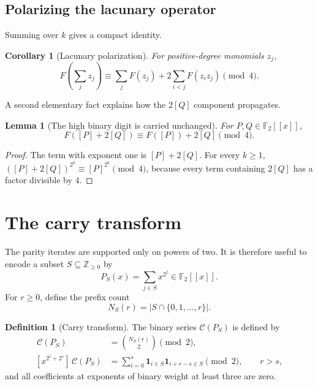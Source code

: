 \documentclass[11pt]{article}
\newtheorem{lemma}[theorem]{Lemma}
\newtheorem{corollary}[theorem]{Corollary}
\theoremstyle{definition}
\newtheorem{definition}[theorem]{Definition}
\theoremstyle{remark}
\newcommand{\Ftwo}{\mathbb F_2}
\newcommand{\coef}[2]{[x^{#1}]\,#2}
\newcommand{\ind}{\mathbf 1}
\begin{document}
\subsection{Polarizing the lacunary operator}

Summing  over $k$ gives a compact identity.

\begin{corollary}[Lacunary polarization]
\label{lim:cor:lacunary-polarization}
For positive-degree monomials $z_j$,
\begin{equation}\label{lim:eq:lacunary-polarization}
 F\!\left(\sum_jz_j\right)
 \equiv
 \sum_jF(z_j)+2\sum_{i<j}F(z_iz_j)
 \pmod4.
\end{equation}
\end{corollary}

A second elementary fact explains how the $2[Q]$ component propagates.

\begin{lemma}[The high binary digit is carried unchanged]
\label{lim:lem:q-passes}
For $P,Q\in\Ftwo[[x]]$,
\begin{equation}\label{lim:eq:q-passes}
  F([P]+2[Q])\equiv F([P])+2[Q]\pmod4.
\end{equation}
\end{lemma}

\begin{proof}
The term with exponent one is $[P]+2[Q]$.  For every $k\ge1$,
$([P]+2[Q])^{2^k}\equiv[P]^{2^k}\pmod4$, because every term containing
$2[Q]$ has a factor divisible by $4$.
\end{proof}

\section{The carry transform}

The parity iterates are supported only on powers of two.  It is therefore
useful to encode a subset $S\subseteq\mathbb Z_{\ge0}$ by
\[
  P_S(x)=\sum_{j\in S}x^{2^j}\in\Ftwo[[x]].
\]
For $r\ge0$, define the prefix count
\[
  N_S(r)=|S\cap\{0,1,\ldots,r\}|.
\]

\begin{definition}[Carry transform]
\label{lim:def:carry-transform}
The binary series $\mathcal C(P_S)$ is defined by
\begin{align}
 \coef{2^r}{\mathcal C(P_S)}
   &=\binom{N_S(r)}2\pmod2,
   \label{lim:eq:carry-one-bit}\\
 \coef{2^r+2^s}{\mathcal C(P_S)}
   &=\sum_{i=0}^{s}\ind_{i\in S}\ind_{i+r-s\in S}\pmod2,
   \qquad r>s,
   \label{lim:eq:carry-two-bit}
\end{align}
and all coefficients at exponents of binary weight at least three are zero.
\end{definition}
\end{document}

